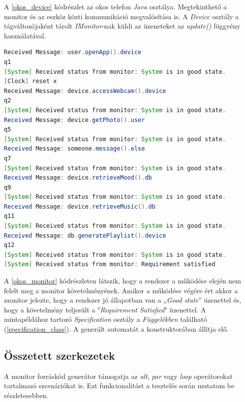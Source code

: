A \ref{okos_device} kódrészlet az okos telefon \textit{Java} osztálya.
Megtekinthető a monitor és az eszköz közti kommunikáció megvalósítása is.
A \textit{Device} osztály a tágváltozójaként tárolt \textit{IMonitor}-nak küldi az üzeneteket az \textit{update()} függvény használatával.

\begin{lstlisting}[language=java, frame=single, float=ht!, caption={Monitor kimenete a rendszer működésének egyes fázisaiban.},captionpos=b,label=okos_monitor]
Received Message: user.openApp().device
q1
[System] Received status from monitor: System is in good state.
[Clock] reset x
Received Message: device.accessWebcam().device
q2
[System] Received status from monitor: System is in good state.
Received Message: device.getPhoto().user
q5
[System] Received status from monitor: System is in good state.
Received Message: someone.message().else
q7
[System] Received status from monitor: System is in good state.
Received Message: device.retrieveMood().db
q9
[System] Received status from monitor: System is in good state.
Received Message: device.retrieveMusic().db
q11
[System] Received status from monitor: System is in good state.
Received Message: db.generatePlaylist().device
q12
[System] Received status from monitor: System is in good state.
[System] Received status from monitor: Requirement satisfied
\end{lstlisting}

A \ref{okos_monitor} kódrészleten látszik, hogy a rendszer a működése elején nem felelt meg a monitor követelményének.
Amikor a működése végére ért akkor a monitor jelezte, hogy a rendszer jó állapotban van a „\textit{Good state}” üzenettel és, hogy a követelmény teljesült a "\textit{Requirement Satisfied}" üzenettel.
A mintapéldához tartozó \textit{Specification} osztály a \textit{Függelékben} található (\ref{specification_class}).
A generált automatát a konstruktorában állítja elő.

\clearpage\subsection{Összetett szerkezetek}

A monitor forráskód generátor támogatja az \textit{alt}, \textit{par} vagy \textit{loop} operátorokat tartalmazó szcenáriókat is.
Ezt funkcionalitást a tesztelés során mutatom be részletesebben.

